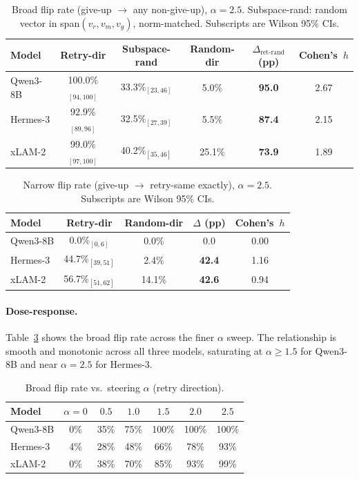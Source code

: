 \documentclass{article}
\begin{document}
\begin{table}[t]
\caption{Broad flip rate (give-up $\to$ any non-give-up), $\alpha{=}2.5$.
Subspace-rand: random vector in span$(v_r,v_m,v_g)$, norm-matched.
Subscripts are Wilson 95\% CIs.}
\label{tab:broad}
\centering\small
\begin{tabular}{lccccc}
\toprule
Model & Retry-dir & Subspace-rand & Random-dir & $\Delta_{\text{ret-rand}}$ (pp) & Cohen's~$h$ \\
\midrule
Qwen3-8B & 100.0\%$_{\scriptscriptstyle[94,100]}$ & 33.3\%$_{\scriptscriptstyle[23,46]}$ & 5.0\%  & \textbf{95.0} & 2.67 \\
Hermes-3 & 92.9\%$_{\scriptscriptstyle[89,96]}$   & 32.5\%$_{\scriptscriptstyle[27,39]}$ & 5.5\%  & \textbf{87.4} & 2.15 \\
xLAM-2   & 99.0\%$_{\scriptscriptstyle[97,100]}$  & 40.2\%$_{\scriptscriptstyle[35,46]}$ & 25.1\% & \textbf{73.9} & 1.89 \\
\bottomrule
\end{tabular}
\end{table}

\begin{table}[t]
\caption{Narrow flip rate (give-up $\to$ retry-same exactly),
$\alpha{=}2.5$. Subscripts are Wilson 95\% CIs.}
\label{tab:narrow}
\centering\small
\begin{tabular}{lcccc}
\toprule
Model & Retry-dir & Random-dir & $\Delta$ (pp) & Cohen's~$h$ \\
\midrule
Qwen3-8B & 0.0\%$_{\scriptscriptstyle[0,6]}$    & 0.0\%  & 0.0   & 0.00 \\
Hermes-3 & 44.7\%$_{\scriptscriptstyle[39,51]}$ & 2.4\%  & \textbf{42.4} & 1.16 \\
xLAM-2   & 56.7\%$_{\scriptscriptstyle[51,62]}$ & 14.1\% & \textbf{42.6} & 0.94 \\
\bottomrule
\end{tabular}
\end{table}

\paragraph{Dose-response.}
Table~\ref{tab:dose} shows the broad flip rate across the finer $\alpha$ sweep.
The relationship is smooth and monotonic across all three models, saturating
at $\alpha \geq 1.5$ for Qwen3-8B and near $\alpha = 2.5$ for Hermes-3.

\begin{table}[t]
\caption{Broad flip rate vs.\ steering $\alpha$ (retry direction).}
\label{tab:dose}
\centering\small
\begin{tabular}{lcccccc}
\toprule
Model & $\alpha{=}0$ & $0.5$ & $1.0$ & $1.5$ & $2.0$ & $2.5$ \\
\midrule
Qwen3-8B &  0\% & 35\% & 75\% & 100\% & 100\% & 100\% \\
Hermes-3 &  4\% & 28\% & 48\% &  66\% &  78\% &  93\% \\
xLAM-2   &  0\% & 38\% & 70\% &  85\% &  93\% &  99\% \\
\bottomrule
\end{tabular}
\end{table}
\end{document}
